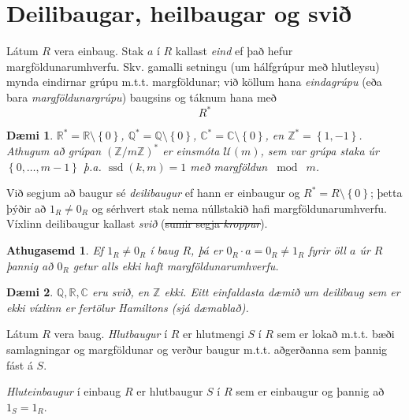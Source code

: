 \documentclass[a4paper,icelandic,11pt]{book}
\theoremstyle{plain}
\newtheorem{daemi}{Dæmi}[chapter]
\newtheorem*{ath}{Athugasemd}
\newcommand{\R}{\mathbb{R}}
\newcommand{\Z}{\mathbb{Z}}
\newcommand{\Q}{\mathbb{Q}}
\newcommand{\C}{\mathbb{C}}
\DeclareMathOperator{\ssd}{ssd} %
\begin{document}
\section{Deilibaugar, heilbaugar og svið}
\begin{skilgr}
  Látum $R$ vera einbaug. Stak $a$ í $R$ kallast \emph{eind} ef það
  hefur margföldunarumhverfu. Skv. gamalli setningu (um hálfgrúpur með 
  hlutleysu) mynda eindirnar grúpu m.t.t. margföldunar; við köllum hana
  \emph{eindagrúpu}
  (eða bara \emph{margföldunargrúpu})
  baugsins og táknum hana með 
  \[
    R^*
  \]
\end{skilgr}
\begin{daemi}
  $\R^* = \R\setminus\left\{ 0 \right\}$, $\Q^* = \Q\setminus\left\{ 0 \right\}$,
  $\C^* = \C\setminus\left\{ 0 \right\}$, en $\Z^* = \left\{ 1,-1 \right\}$.
  Athugum að grúpan $(\Z/m\Z)^*$ er einsmóta $\mathcal U(m)$, sem var grúpa
  staka úr $\left\{ 0,\dots,m-1 \right\}$ þ.a. $\ssd(k,m) = 1$ með margföldun
  $\bmod\;m$.
\end{daemi}
\begin{skilgr}
  Við segjum að baugur sé
  \emph{deilibaugur} ef hann er
  einbaugur og $R^* = R\setminus\left\{ 0 \right\}$; þetta þýðir að $1_R\neq0_R$
  og sérhvert stak nema núllstakið hafi margföldunarumhverfu. Víxlinn 
  deilibaugur kallast \emph{svið} (\sout{sumir segja
  \emph{kroppur}}).
\end{skilgr}
\begin{ath}
  Ef $1_R\neq 0_R$ í baug $R$, þá er $0_R\cdot a = 0_R\neq 1_R$ fyrir öll
  $a$ úr $R$ þannig að $0_R$ getur alls ekki haft margföldunarumhverfu.
\end{ath}
\begin{daemi}
  $\Q,\R,\C$ eru svið, en $\Z$ ekki. Eitt einfaldasta dæmið um deilibaug sem er
  ekki víxlinn er \emph{fertölur Hamiltons} (sjá dæmablað).
\end{daemi}
\begin{skilgr}
  Látum $R$ vera baug.
  \emph{Hlutbaugur} í $R$ er hlutmengi
  $S$ í $R$ sem er lokað m.t.t. bæði samlagningar og margföldunar og verður 
  baugur m.t.t. aðgerðanna sem þannig fást á $S$.
  
  \emph{Hluteinbaugur} í einbaug $R$ er hlutbaugur
  $S$ í $R$ sem er einbaugur og þannig að $1_S = 1_R$.
\end{skilgr}
\end{document}
